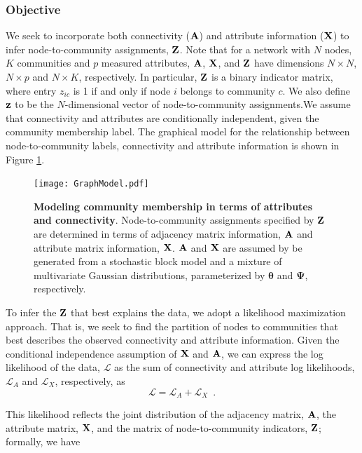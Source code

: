 \subsubsection{Objective}
We seek to incorporate both connectivity (${\bf A}$) and attribute information (${\bf X}$) to infer node-to-community assignments, ${\bf Z}$. Note that for a network with $N$ nodes, $K$ communities and $p$ measured attributes, ${\bf A}$, ${\bf X}$, and ${\bf Z}$ have dimensions $N \times N$, $N \times p$ and $N \times K$, respectively. In particular, ${\bf Z}$ is a binary indicator matrix, where entry $z_{ic}$ is 1 if and only if node $i$ belongs to community $c$. We also define ${\bf z}$ to be the $N$-dimensional vector of node-to-community assignments.We assume that connectivity and attributes are conditionally independent, given the community membership label. The graphical model for the relationship between node-to-community labels, connectivity and attribute information is shown in Figure \ref{fig:graphical_model}.

\begin{figure}
\begin{center}
\texttt{[image: GraphModel.pdf]}
\caption{{\bf Modeling community membership in terms of attributes and connectivity}. Node-to-community assignments specified by ${\bf Z}$ are determined in terms of adjacency matrix information, ${\bf A}$ and attribute matrix information, ${\bf X}$. ${\bf A}$ and ${\bf X}$ are assumed by be generated from a stochastic block model and a mixture of multivariate Gaussian distributions, parameterized by ${\boldsymbol \theta}$ and ${\boldsymbol \Psi}$, respectively.
\label{fig:graphical_model}} 
\end{center}
\end{figure}

To infer the ${\bf Z}$ that best explains the data, we adopt a likelihood maximization approach. That is, we seek to find the partition of nodes to communities that best describes the observed connectivity and attribute information.  Given the conditional independence assumption of ${\bf X}$ and ${\bf A}$, we can express the log likelihood of the data, ${\mathcal L}$ as the sum of connectivity and attribute log likelihoods, ${\mathcal L}_{A}$ and ${\mathcal L}_{X}$, respectively,
as
\begin{equation}
\mathcal{L}=\mathcal{L}_{A}+\mathcal{L}_{X}\enspace.
\label{eqn:likelihood_decomposition}
\end{equation}

This likelihood reflects the joint distribution of the adjacency matrix, ${\bf A}$, the attribute matrix, ${\bf X}$, and the matrix of node-to-community indicators, ${\bf Z}$; formally, we have 

